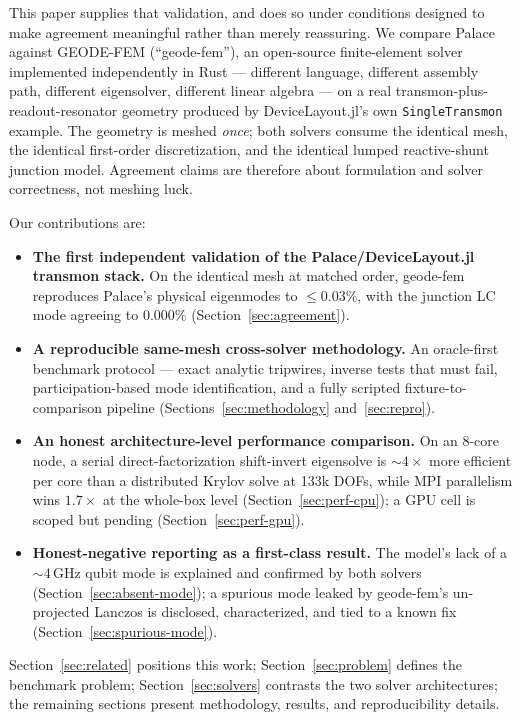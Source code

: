 \documentclass{anvil-paper}
\begin{document}
This paper supplies that validation, and does so under conditions designed
to make agreement meaningful rather than merely reassuring. We compare
Palace against GEODE-FEM (``geode-fem''), an open-source finite-element
solver implemented independently in Rust --- different language, different
assembly path, different eigensolver, different linear algebra --- on a real
transmon-plus-readout-resonator geometry produced by DeviceLayout.jl's own
\texttt{SingleTransmon} example. The geometry is meshed \emph{once}; both
solvers consume the identical mesh, the identical first-order discretization,
and the identical lumped reactive-shunt junction model. Agreement claims are
therefore about formulation and solver correctness, not meshing luck.

Our contributions are:
\begin{itemize}
  \item \textbf{The first independent validation of the Palace/DeviceLayout.jl
    transmon stack.} On the identical mesh at matched order, geode-fem
    reproduces Palace's physical eigenmodes to $\leq 0.03\%$, with the
    junction LC mode agreeing to $0.000\%$
    (Section~\ref{sec:agreement}).
  \item \textbf{A reproducible same-mesh cross-solver methodology.} An
    oracle-first benchmark protocol --- exact analytic tripwires, inverse
    tests that must fail, participation-based mode identification, and a
    fully scripted fixture-to-comparison pipeline
    (Sections~\ref{sec:methodology} and~\ref{sec:repro}).
  \item \textbf{An honest architecture-level performance comparison.} On an
    8-core node, a serial direct-factorization shift-invert eigensolve is
    ${\sim}4\times$ more efficient per core than a distributed Krylov solve
    at 133k DOFs, while MPI parallelism wins $1.7\times$ at the whole-box
    level (Section~\ref{sec:perf-cpu}); a GPU cell is scoped but pending
    (Section~\ref{sec:perf-gpu}).
  \item \textbf{Honest-negative reporting as a first-class result.} The
    model's lack of a ${\sim}4$\,GHz qubit mode is explained and confirmed
    by both solvers (Section~\ref{sec:absent-mode}); a spurious mode leaked
    by geode-fem's un-projected Lanczos is disclosed, characterized, and
    tied to a known fix (Section~\ref{sec:spurious-mode}).
\end{itemize}

Section~\ref{sec:related} positions this work; Section~\ref{sec:problem}
defines the benchmark problem; Section~\ref{sec:solvers} contrasts the two
solver architectures; the remaining sections present methodology, results,
and reproducibility details.
\end{document}
